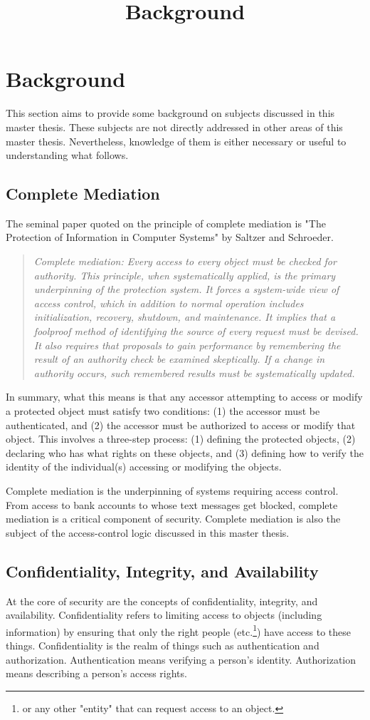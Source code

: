 \documentclass[../../main/main.tex]{subfiles}
\begin{document}
\title{Background}

\chapter{Background}
This section aims to provide some background on subjects discussed in this master thesis.  These subjects are not directly addressed in other areas of this master thesis.  Nevertheless, knowledge of them is either necessary or useful to understanding what follows.  

\section{Complete Mediation}
The seminal paper quoted on the principle of complete mediation is "The Protection of Information in Computer Systems" by Saltzer and Schroeder.  
\begin{quote}
\textit{
Complete mediation: Every access to every object must be checked for authority. This principle, when systematically applied, is the primary underpinning of the protection system. It forces a system-wide view of access control, which in addition to normal operation includes initialization, recovery, shutdown, and maintenance. It implies that a foolproof method of identifying the source of every request must be devised. It also requires that proposals to gain performance by remembering the result of an authority check be examined skeptically. If a change in authority occurs, such remembered results must be systematically updated.} \cite{saltzer}
\end{quote}

In summary, what this means is that any accessor attempting to access or modify a protected object must satisfy two conditions: (1) the accessor must be authenticated, and (2) the accessor must be authorized to access or modify that object.  This involves a three-step process: (1) defining the protected objects, (2) declaring who has what rights on these objects, and (3) defining how to verify the identity of the individual(s) accessing or modifying the objects.  


Complete mediation is the underpinning of systems requiring access control.  From access to bank accounts to whose text messages get blocked, complete mediation is a critical component of security.  Complete mediation is also the subject of the access-control logic discussed in this master thesis. 

\section{Confidentiality, Integrity, and Availability}
At the core of security are the concepts of confidentiality, integrity, and availability.  Confidentiality refers to limiting access to objects (including information) by ensuring that only the right people (etc.\footnote{or any other "entity" that can request access to an object.}) have access to these things.  Confidentiality is the realm of things such as authentication and authorization.  Authentication means verifying a person's identity.  Authorization means describing a person's access rights. 
\end{document}
